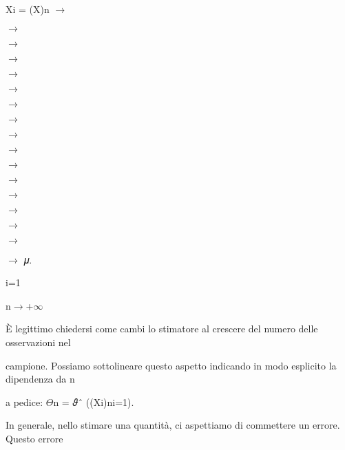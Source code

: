 \documentclass[a4paper,portrait,12pt]{article}
\begin{document}
\begin{flushleft}
Xi = (X)n $\rightarrow$
\end{flushleft}


$\rightarrow$


$\rightarrow$


$\rightarrow$


$\rightarrow$


$\rightarrow$


$\rightarrow$


$\rightarrow$


$\rightarrow$


$\rightarrow$


$\rightarrow$


$\rightarrow$


$\rightarrow$


$\rightarrow$


$\rightarrow$


$\rightarrow$


\begin{flushleft}
$\rightarrow$ 𝜇.
\end{flushleft}


\begin{flushleft}
i=1
\end{flushleft}





\begin{flushleft}
n$\rightarrow$+$\infty$
\end{flushleft}





\begin{flushleft}
\`{E} legittimo chiedersi come cambi lo stimatore al crescere del numero delle osservazioni nel
\end{flushleft}


\begin{flushleft}
campione. Possiamo sottolineare questo aspetto indicando in modo esplicito la dipendenza da n
\end{flushleft}


\begin{flushleft}
a pedice: $\Theta$n = 𝜗ˆ ((Xi)ni=1).
\end{flushleft}


\begin{flushleft}
In generale, nello stimare una quantit\`{a}, ci aspettiamo di commettere un errore. Questo errore
\end{flushleft}
\end{document}
